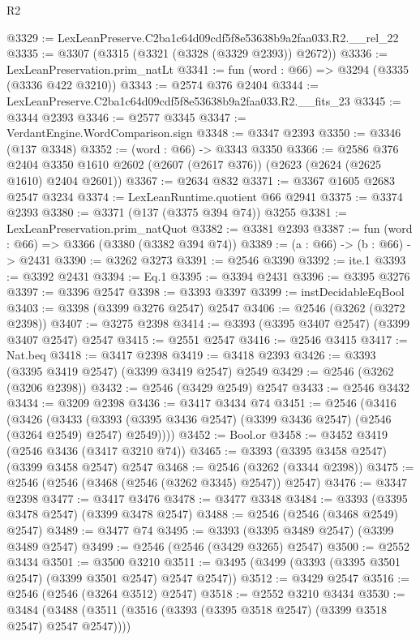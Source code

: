 \begin{lexlean}{R2}
\begin{coremodule}
@3329 := LexLeanPreserve.C2ba1c64d09cdf5f8e53638b9a2faa033.R2.__rel_22
@3335 := @3307 (@3315 (@3321 (@3328 (@3329 @2393)) @2672))
@3336 := LexLeanPreservation.prim_natLt
@3341 := fun (word : @66) => @3294 (@3335 (@3336 @422 @3210))
@3343 := @2574 @376 @2404
@3344 := LexLeanPreserve.C2ba1c64d09cdf5f8e53638b9a2faa033.R2.__fits_23
@3345 := @3344 @2393
@3346 := @2577 @3345
@3347 := VerdantEngine.WordComparison.sign
@3348 := @3347 @2393
@3350 := @3346 (@137 @3348)
@3352 := (word : @66) -> @3343 @3350
@3366 := @2586
    @376
    @2404
    @3350
    @1610
    @2602
    (@2607 (@2617 @376))
    (@2623 (@2624 (@2625 @1610) @2404 @2601))
@3367 := @2634 @832
@3371 := @3367 @1605 @2683 @2547 @3234
@3374 := LexLeanRuntime.quotient @66 @2941
@3375 := @3374 @2393
@3380 := @3371 (@137 (@3375 @394 @74)) @3255
@3381 := LexLeanPreservation.prim_natQuot
@3382 := @3381 @2393
@3387 := fun (word : @66) => @3366 (@3380 (@3382 @394 @74))
@3389 := (a : @66) -> (b : @66) -> @2431
@3390 := @3262 @3273
@3391 := @2546 @3390
@3392 := ite.{1}
@3393 := @3392 @2431
@3394 := Eq.{1}
@3395 := @3394 @2431
@3396 := @3395 @3276
@3397 := @3396 @2547
@3398 := @3393 @3397
@3399 := instDecidableEqBool
@3403 := @3398 (@3399 @3276 @2547) @2547
@3406 := @2546 (@3262 (@3272 @2398))
@3407 := @3275 @2398
@3414 := @3393 (@3395 @3407 @2547) (@3399 @3407 @2547) @2547
@3415 := @2551 @2547
@3416 := @2546 @3415
@3417 := Nat.beq
@3418 := @3417 @2398
@3419 := @3418 @2393
@3426 := @3393 (@3395 @3419 @2547) (@3399 @3419 @2547) @2549
@3429 := @2546 (@3262 (@3206 @2398))
@3432 := @2546 (@3429 @2549) @2547
@3433 := @2546 @3432
@3434 := @3209 @2398
@3436 := @3417 @3434 @74
@3451 := @2546
    (@3416
      (@3426
        (@3433 (@3393 (@3395 @3436 @2547) (@3399 @3436 @2547) (@2546 (@3264 @2549) @2547) @2549))))
@3452 := Bool.or
@3458 := @3452 @3419 (@2546 @3436 (@3417 @3210 @74))
@3465 := @3393 (@3395 @3458 @2547) (@3399 @3458 @2547) @2547
@3468 := @2546 (@3262 (@3344 @2398))
@3475 := @2546 (@2546 (@3468 (@2546 (@3262 @3345) @2547)) @2547)
@3476 := @3347 @2398
@3477 := @3417 @3476
@3478 := @3477 @3348
@3484 := @3393 (@3395 @3478 @2547) (@3399 @3478 @2547)
@3488 := @2546 (@2546 (@3468 @2549) @2547)
@3489 := @3477 @74
@3495 := @3393 (@3395 @3489 @2547) (@3399 @3489 @2547)
@3499 := @2546 (@2546 (@3429 @3265) @2547)
@3500 := @2552 @3434
@3501 := @3500 @3210
@3511 := @3495 (@3499 (@3393 (@3395 @3501 @2547) (@3399 @3501 @2547) @2547 @2547))
@3512 := @3429 @2547
@3516 := @2546 (@2546 (@3264 @3512) @2547)
@3518 := @2552 @3210 @3434
@3530 := @3484 (@3488 (@3511 (@3516 (@3393 (@3395 @3518 @2547) (@3399 @3518 @2547) @2547 @2547))))

\end{coremodule}
\end{lexlean}
